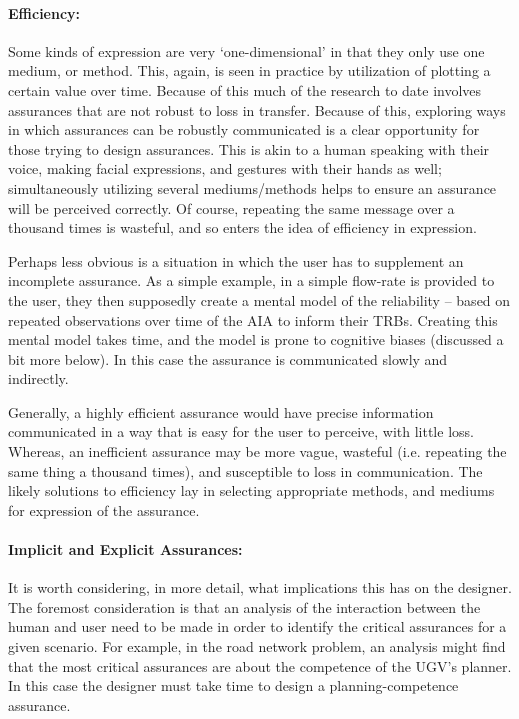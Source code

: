     \paragraph{Efficiency:} Some kinds of expression are very `one-dimensional' in that they only use one medium, or method. This, again, is seen in practice by utilization of plotting a certain value over time. Because of this much of the research to date involves assurances that are not robust to loss in transfer. Because of this, exploring ways in which assurances can be robustly communicated is a clear opportunity for those trying to design assurances. This is akin to a human speaking with their voice, making facial expressions, and gestures with their hands as well; simultaneously utilizing several mediums/methods helps to ensure an assurance will be perceived correctly. Of course, repeating the same message over a thousand times is wasteful, and so enters the idea of efficiency in expression.

    Perhaps less obvious is a situation in which the user has to supplement an incomplete assurance. As a simple example, in \cite{Muir1994-ow} a simple flow-rate is provided to the user, they then supposedly create a mental model of the reliability -- based on repeated observations over time of the AIA to inform their TRBs. Creating this mental model takes time, and the model is prone to cognitive biases (discussed a bit more below). In this case the assurance is communicated slowly and indirectly.
    
    Generally, a highly efficient assurance would have precise information communicated in a way that is easy for the user to perceive, with little loss. Whereas, an inefficient assurance may be more vague, wasteful (i.e. repeating the same thing a thousand times), and susceptible to loss in communication. The likely solutions to efficiency lay in selecting appropriate methods, and mediums for expression of the assurance.

    \paragraph{Implicit and Explicit Assurances:} It is worth considering, in more detail, what implications this has on the designer. The foremost consideration is that an analysis of the interaction between the human and user need to be made in order to identify the critical assurances for a given scenario. For example, in the road network problem, an analysis might find that the most critical assurances are about the competence of the UGV's planner. In this case the designer must take time to design a planning-competence assurance.


